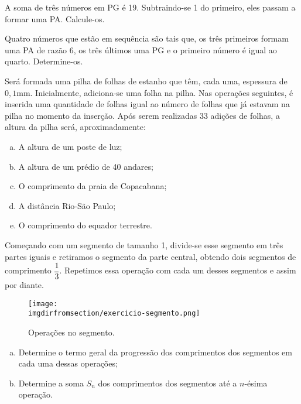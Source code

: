 \begin{exercise}
    A soma de três números em PG é 19. Subtraindo-se 1 do primeiro,
eles passam a formar uma PA. Calcule-os.
\end{exercise}

\begin{exercise}
    Quatro números que estão em sequência são tais que, os três
primeiros formam uma PA de razão 6, os três últimos uma PG e o
primeiro número é igual ao quarto. Determine-os.
\end{exercise}

\begin{exercise}
Será formada uma pilha de folhas de estanho que têm, cada uma,
espessura de $0,1$mm. Inicialmente, adiciona-se uma folha na pilha.
Nas operações seguintes, é inserida uma quantidade de folhas igual
ao número de folhas que já estavam na pilha no momento da inserção.
Após serem realizadas 33 adições de folhas, a altura da pilha será,
aproximadamente:
\begin{enumerate}[a)]
  \item A altura de um poste de luz;
  \item A altura de um prédio de 40 andares;
  \item O comprimento da praia de Copacabana;
  \item A distância Rio-São Paulo;
  \item O comprimento do equador terrestre.
\end{enumerate}
\end{exercise}

\begin{exercise}
    Começando com um segmento de tamanho 1, divide-se esse segmento em três partes iguais e retiramos o segmento da parte central, obtendo dois segmentos de comprimento $\dfrac 1 3$. Repetimos essa operação com cada um desses segmentos e assim por diante.
    \begin{figure}[H]
        \centering
        \label{fig:exercicio-segmento}
        \texttt{[image: \\imgdirfromsection/exercicio-segmento.png]}
	\caption{Operações no segmento.}
    \end{figure}
    \begin{enumerate}[a)]
	\item Determine o termo geral da progressão dos comprimentos dos segmentos em cada uma dessas operações;
	\item Determine a soma $S_n$ dos comprimentos dos segmentos até a $n$-ésima operação.
    \end{enumerate}
\end{exercise}

